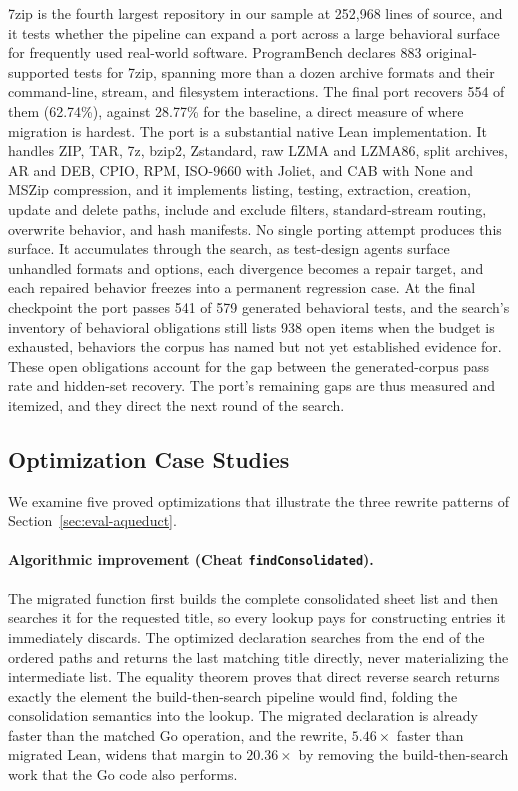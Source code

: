7zip is the fourth largest repository in our sample at 252,968 lines of source, and it tests whether the pipeline can expand a port across a large behavioral surface for frequently used real-world software.
ProgramBench declares 883 original-supported tests for 7zip, spanning more than a dozen archive formats and their command-line, stream, and filesystem interactions.
The final port recovers 554 of them (62.74\%), against 28.77\% for the baseline, a direct measure of where migration is hardest.
The port is a substantial native Lean implementation.
It handles ZIP, TAR, 7z, bzip2, Zstandard, raw LZMA and LZMA86, split archives, AR and DEB, CPIO, RPM, ISO-9660 with Joliet, and CAB with None and MSZip compression, and it implements listing, testing, extraction, creation, update and delete paths, include and exclude filters, standard-stream routing, overwrite behavior, and hash manifests.
No single porting attempt produces this surface.
It accumulates through the search, as test-design agents surface unhandled formats and options, each divergence becomes a repair target, and each repaired behavior freezes into a permanent regression case.
At the final checkpoint the port passes 541 of 579 generated behavioral tests, and the search's inventory of behavioral obligations still lists 938 open items when the budget is exhausted, behaviors the corpus has named but not yet established evidence for.
These open obligations account for the gap between the generated-corpus pass rate and hidden-set recovery.
The port's remaining gaps are thus measured and itemized, and they direct the next round of the search.

\subsection{Optimization Case Studies}

We examine five proved optimizations that illustrate the three rewrite patterns of Section~\ref{sec:eval-aqueduct}.

\paragraph{Algorithmic improvement (Cheat \texttt{findConsolidated}).}
The migrated function first builds the complete consolidated sheet list and then searches it for the requested title, so every lookup pays for constructing entries it immediately discards.
The optimized declaration searches from the end of the ordered paths and returns the last matching title directly, never materializing the intermediate list.
The equality theorem proves that direct reverse search returns exactly the element the build-then-search pipeline would find, folding the consolidation semantics into the lookup.
The migrated declaration is already faster than the matched Go operation, and the rewrite, $5.46\times$ faster than migrated Lean, widens that margin to $20.36\times$ by removing the build-then-search work that the Go code also performs.

